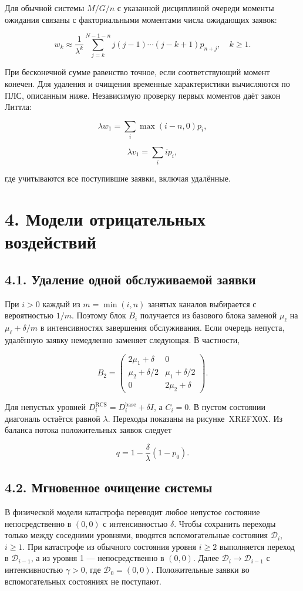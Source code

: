 Для обычной системы \(M/G/n\) с указанной дисциплиной очереди моменты ожидания связаны с факториальными моментами числа ожидающих заявок:


\[w_k\approx\frac{1}{\lambda^k}\sum_{j=k}^{N-1-n}j(j-1)\cdots(j-k+1)p_{n+j},\quad k\ge1.\]


При бесконечной сумме равенство точное, если соответствующий момент конечен. Для удаления и очищения временные характеристики вычисляются по ПЛС, описанным ниже. Независимую проверку первых моментов даёт закон Литтла:


\[\lambda w_1=\sum_i\max(i-n,0)p_i,\]

\[\lambda v_1=\sum_i i p_i,\]


где учитываются все поступившие заявки, включая удалённые.

\section*{4. Модели отрицательных воздействий}
\subsection*{4.1. Удаление одной обслуживаемой заявки}
При \(i>0\) каждый из \(m=\min(i,n)\) занятых каналов выбирается с вероятностью \(1/m.\) Поэтому блок \(B_i\) получается из базового блока заменой \(\mu_\ell\) на \(\mu_\ell+\delta/m\) в интенсивностях завершения обслуживания. Если очередь непуста, удалённую заявку немедленно заменяет следующая. В частности,


\[B_2=\begin{pmatrix}2\mu_1+\delta&0\\\mu_2+\delta/2&\mu_1+\delta/2\\0&2\mu_2+\delta\end{pmatrix}.\]


Для непустых уровней \(D_i^{\mathrm{RCS}}=D_i^{\mathrm{base}}+\delta I\), а \(C_i=0.\) В пустом состоянии диагональ остаётся равной \(\lambda.\) Переходы показаны на рисунке~XREFX0X. Из баланса потока положительных заявок следует


\[q=1-\frac{\delta}{\lambda}(1-p_0).\]



\subsection*{4.2. Мгновенное очищение системы}
В физической модели катастрофа переводит любое непустое состояние непосредственно в \((0,0)\) с интенсивностью \(\delta.\) Чтобы сохранить переходы только между соседними уровнями, вводятся вспомогательные состояния \(\mathcal{D}_i\), \(i\ge1.\) При катастрофе из обычного состояния уровня \(i\ge2\) выполняется переход в \(\mathcal{D}_{i-1}\), а из уровня 1 --- непосредственно в \((0,0).\) Далее \(\mathcal{D}_i\to \mathcal{D}_{i-1}\) с интенсивностью \(\gamma>0\), где \(\mathcal{D}_0=(0,0).\) Положительные заявки во вспомогательных состояниях не поступают.

